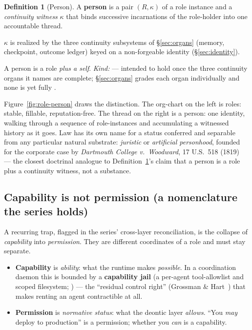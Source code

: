 \documentclass[11pt,a4paper]{article}
\theoremstyle{definition}
\newtheorem{definition}{Definition}[section]
\begin{document}
\begin{definition}[Person]\label{def:person}
\setlength{\parskip}{4pt plus 1pt}
A \textbf{person} is a pair $(R, \kappa)$ of a role instance and a
\emph{continuity witness} $\kappa$ that binds successive incarnations of the
role-holder into one accountable thread. 

$\kappa$ is realized by the three
continuity subsystems of \S\ref{sec:organs} (memory, checkpoint, outcome ledger) keyed
on a non-forgeable identity (\S\ref{sec:identity}). 

A person is a role
\emph{plus a self}. \emph{Kind:} \DesignInvariantKind{} --- intended to hold once the
three continuity organs it names are complete; \S\ref{sec:organs} grades each
organ individually and none is yet fully \BUILT.
\end{definition}

\noindent Figure~\ref{fig:role-person} draws the distinction. The org-chart on the
left is roles: stable, fillable, reputation-free. The thread on the right is a
person: one identity, walking through a sequence of role-instances and
accumulating a witnessed history as it goes. Law has its own name for a status
conferred and separable from any particular natural substrate: \emph{juristic}
or \emph{artificial personhood}, founded for the corporate case by
\emph{Dartmouth College v.\ Woodward}, 17 U.S.\ 518 (1819)~
--- the closest doctrinal analogue to Definition~\ref{def:person}'s claim that a
person is a role plus a continuity witness, not a substance.



\subsection{Capability is not permission (a nomenclature the series holds)}

A recurring trap, flagged in the series' cross-layer reconciliation, is the
collapse of \emph{capability} into \emph{permission}. They are different
coordinates of a role and must stay separate.

\begin{itemize}[leftmargin=1.4em]
  \item \textbf{Capability} is \emph{ability}: what the runtime makes
  \emph{possible}. In a coordination daemon this is bounded by a
  \textbf{capability jail} (a per-agent tool-allowlist and scoped filesystem;
  \DESIGNED) --- the ``residual control right'' (Grossman \&
  Hart~) that makes renting an agent contractible at all.
  \item \textbf{Permission} is \emph{normative status}: what the deontic layer
  \emph{allows}. ``You \emph{may} deploy to production'' is a permission; whether
  you \emph{can} is a capability.
\end{itemize}
\end{document}
